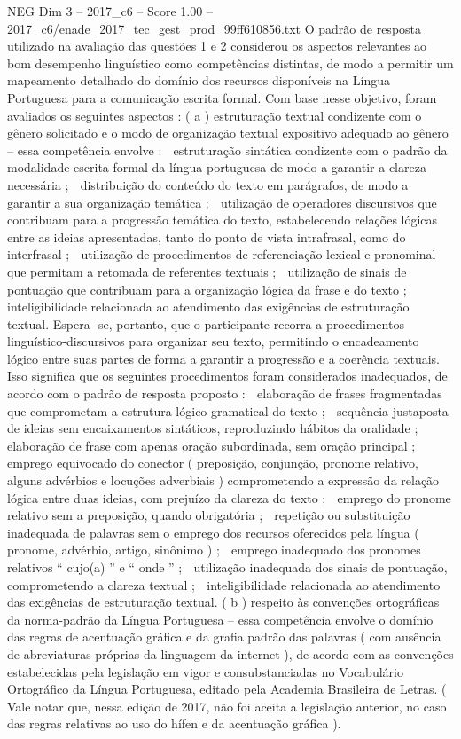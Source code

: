 \begin{textsample}{NEG Dim 3 – 2017\_c6 – Score 1.00 – 2017\_c6/enade\_2017\_tec\_gest\_prod\_99ff610856.txt}
O padrão de resposta utilizado na avaliação das questões 1 e 2 considerou os aspectos relevantes ao bom desempenho linguístico como competências distintas, de modo a permitir um mapeamento detalhado do domínio dos recursos disponíveis na Língua Portuguesa para a comunicação escrita formal.
Com base nesse objetivo, foram avaliados os seguintes aspectos : ( a ) estruturação textual condizente com o gênero solicitado e o modo de organização textual expositivo adequado ao gênero – essa competência envolve :  estruturação sintática condizente com o padrão da modalidade escrita formal da língua portuguesa de modo a garantir a clareza necessária ;  distribuição do conteúdo do texto em parágrafos, de modo a garantir a sua organização temática ;  utilização de operadores discursivos que contribuam para a progressão temática do texto, estabelecendo relações lógicas entre as ideias apresentadas, tanto do ponto de vista intrafrasal, como do interfrasal ;  utilização de procedimentos de referenciação lexical e pronominal que permitam a retomada de referentes textuais ;  utilização de sinais de pontuação que contribuam para a organização lógica da frase e do texto ;  inteligibilidade relacionada ao atendimento das exigências de estruturação textual.
Espera -se, portanto, que o participante recorra a procedimentos linguístico-discursivos para organizar seu texto, permitindo o encadeamento lógico entre suas partes de forma a garantir a progressão e a coerência textuais.
Isso significa que os seguintes procedimentos foram considerados inadequados, de acordo com o padrão de resposta proposto :  elaboração de frases fragmentadas que comprometam a estrutura lógico-gramatical do texto ;  sequência justaposta de ideias sem encaixamentos sintáticos, reproduzindo hábitos da oralidade ;  elaboração de frase com apenas oração subordinada, sem oração principal ;  emprego equivocado do conector ( preposição, conjunção, pronome relativo, alguns advérbios e locuções adverbiais ) comprometendo a expressão da relação lógica entre duas ideias, com prejuízo da clareza do texto ;  emprego do pronome relativo sem a preposição, quando obrigatória ;  repetição ou substituição inadequada de palavras sem o emprego dos recursos oferecidos pela língua ( pronome, advérbio, artigo, sinônimo ) ;  emprego inadequado dos pronomes relativos “ cujo(a) ” e “ onde ” ;  utilização inadequada dos sinais de pontuação, comprometendo a clareza textual ;  inteligibilidade relacionada ao atendimento das exigências de estruturação textual. ( b ) respeito às convenções ortográficas da norma-padrão da Língua Portuguesa – essa competência envolve o domínio das regras de acentuação gráfica e da grafia padrão das palavras ( com ausência de abreviaturas próprias da linguagem da internet ), de acordo com as convenções estabelecidas pela legislação em vigor e consubstanciadas no Vocabulário Ortográfico da Língua Portuguesa, editado pela Academia Brasileira de Letras. ( Vale notar que, nessa edição de 2017, não foi aceita a legislação anterior, no caso das regras relativas ao uso do hífen e da acentuação gráfica ).

\end{textsample}
